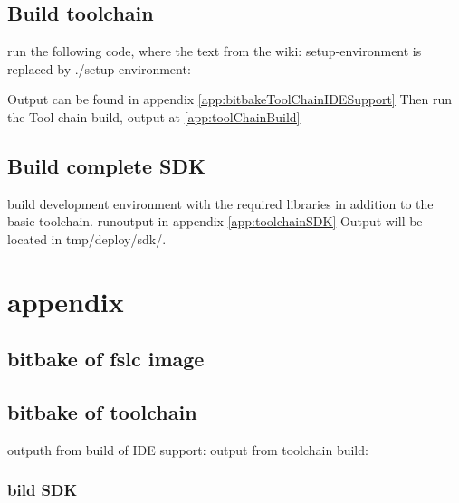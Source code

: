 \documentclass[10pt]{article}
\begin{document}
\subsection{ Build toolchain }%
run the following code, where the text from the wiki: setup-environment is replaced by ./setup-environment:

Output can be found in appendix \ref{app:bitbakeToolChainIDESupport}
Then run the Tool chain build, output at \ref{app:toolChainBuild}

\subsection{Build complete SDK}
build development environment with the required libraries in addition to the basic toolchain.
runoutput in appendix \ref{app:toolchainSDK}
Output will be located in tmp/deploy/sdk/.


\section{appendix}

\subsection{bitbake of fslc image}
\label{app:GUIImage}

\subsection{bitbake of toolchain}
outputh from build of IDE support:
\label{app:toolChainIDESupport}
output from toolchain build:
\label{app:toolChainBuild}
\subsubsection{bild SDK}
\label{app:toolChainSDK}



%
\end{document}

